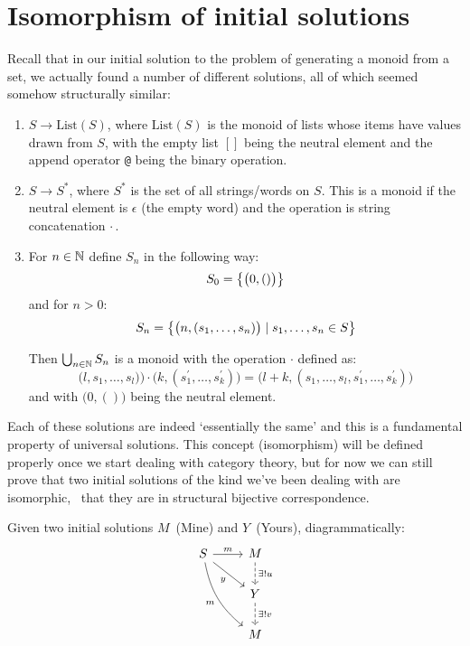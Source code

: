 \section{Isomorphism of initial solutions}

Recall that in our initial solution to the problem of generating a monoid
from a set, we actually found a number of different solutions, all of which
seemed somehow structurally similar:

\begin{enumerate}

\item $S \to \mathrm{List}(S)$, where $\mathrm{List}(S)$ is the monoid of lists
whose items have values drawn from $S$, with the empty list $[]$ being the
neutral element and the append operator \texttt{@} being the binary
operation.

\item $S \to S^\ast$, where $S^\ast$ is the set of all strings/words on $S$.
This is a monoid if the neutral element is $\epsilon$ (the empty word) and the
operation is string concatenation $\cdot$\,.

\item For $n \in \mathbb{N}$ define $S_n$ in the following way:
\[
S_0 = \big\{  \big(0, ()\big)  \big\}
\]
and for $n > 0$:
\[
S_n
= \big\{ \big(n, (s_1, \ldots, s_n)\big) \mid s_1, \ldots, s_n \in S \big\}
\]

Then $\bigcup_{n\in\mathbb{N}} S_n$ is a monoid with the operation $\cdot$ defined
as:
\[
\big(l, s_1, \ldots, s_l)\big)
\cdot
\big(k, (s_1^\prime, \ldots, s_k^\prime)\big)
=
\big(l + k, (s_1, \ldots, s_l, s_1^\prime, \ldots, s_k^\prime)\big)
\]
and with $\big(0, ()\big)$ being the neutral element.

\end{enumerate}

Each of these solutions are indeed `essentially the same' and this is a
fundamental property of universal solutions. This concept (isomorphism)
will be defined properly once we start dealing with category theory, but for
now we can still prove that two initial solutions of the kind we've been
dealing with are isomorphic, \ie~that they are in structural bijective
correspondence.

Given two initial solutions $M$~(Mine) and $Y$~(Yours), diagrammatically:
$$
\begin{tikzcd}
    S \arrow[r, "m"] \arrow[rd, swap, "y"]
    \arrow[rdd, swap, bend right = 20, "m"] &
    M \arrow[d, dashed, "\exists! u"] \\
    {} & Y \arrow[d, dashed, "\exists! v"] \\
    {} & M
\end{tikzcd}
$$

